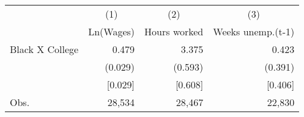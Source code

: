 \begin{tabular*}{\textwidth}{@{\hskip\tabcolsep\extracolsep\fill}l*{3}{r}} \toprule
                    &\multicolumn{1}{c}{(1)}&\multicolumn{1}{c}{(2)}&\multicolumn{1}{c}{(3)}\\
                    &\multicolumn{1}{c}{Ln(Wages)}&\multicolumn{1}{c}{Hours worked}&\multicolumn{1}{c}{Weeks unemp.(t-1)}\\
\midrule
Black X College     &       0.479         &       3.375         &       0.423         \\
                    &     (0.029)\sym{***}&     (0.593)\sym{***}&     (0.391)         \\
                    &     [0.029]\sym{***}&     [0.608]\sym{***}&     [0.406]         \\\bottomrule
Obs.                &      28,534         &      28,467         &      22,830         \\
\bottomrule \end{tabular*}

